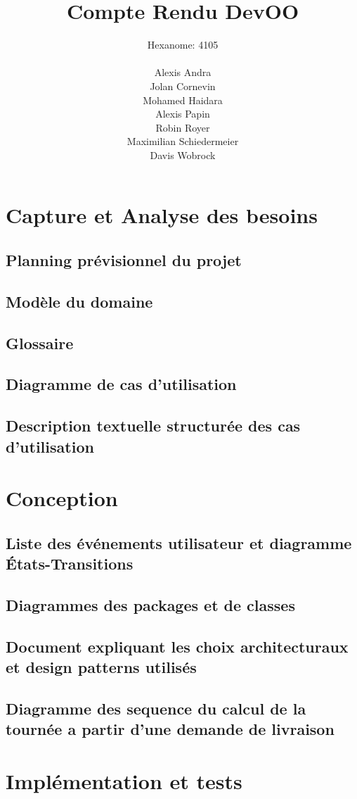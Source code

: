 \documentclass[10pt,a4paper]{book}
\author{Hexanome: 4105\\\\Alexis Andra\\Jolan Cornevin\\Mohamed Haidara\\Alexis Papin\\Robin Royer\\Maximilian Schiedermeier\\Davis Wobrock}
\title{Compte Rendu DevOO}
\begin{document}
\maketitle
\tableofcontents 
\chapter{Capture et Analyse des besoins}
\section{Planning prévisionnel du projet}
\section{Modèle du domaine}
\section{Glossaire}
\section{Diagramme de cas d'utilisation}
\section{Description textuelle structurée des cas d'utilisation}
\chapter{Conception}
\section{Liste des événements utilisateur et diagramme États-Transitions}
\section{Diagrammes des packages et de classes}
\section{Document expliquant les choix architecturaux et design patterns utilisés}
\section{Diagramme des sequence du calcul de la tournée a partir d'une demande de livraison}
\chapter{Implémentation et tests}
\end{document}
